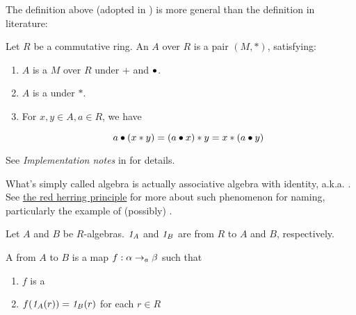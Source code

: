 \begin{remark}
    \label{mk:AlgebraLiterature}

    The definition above (adopted in \Mathlib) is more general than the definition in literature:

    Let $R$ be a commutative ring. An  $A$ over $R$ is a pair $(M, *)$, satisfying:

    \begin{enumerate}
    \item $A$ is a  $M$ over $R$ under $+$ and $\bullet$.

    \item $A$ is a  under $*$.

    \item For $x, y \in A, a \in R$, we have
    
    $$
    a \bullet (x * y) = (a \bullet x) * y = x * (a \bullet y)
    $$

    \end{enumerate}

    See \emph{Implementation notes} in  for details.
    
\end{remark}

\begin{remark}
    \label{mk:AlgebraName}

    What's simply called algebra is actually associative algebra with identity, a.k.a. . See
    \href{https://ncatlab.org/nlab/show/red%20herring%20principle}{the red herring principle}
    for more about such phenomenon for naming, particularly the example of (possibly) .
    
\end{remark}

\begin{definition}
    \label{AlgHom}
    \leanok

    Let $A$ and $B$ be $R$-algebras. $\mathit{1}_A$ and $\mathit{1}_B$ are  from $R$ to $A$ and $B$, respectively.

    A  from $A$ to $B$ is a map $f : \alpha \to_{a} \beta$ such that

    \begin{enumerate}

    \item $f$ is a 

    \item $f(\mathit{1}_{A}(r)) = \mathit{1}_{B}(r)$ for each $r \in R$

    \end{enumerate}

\end{definition}

